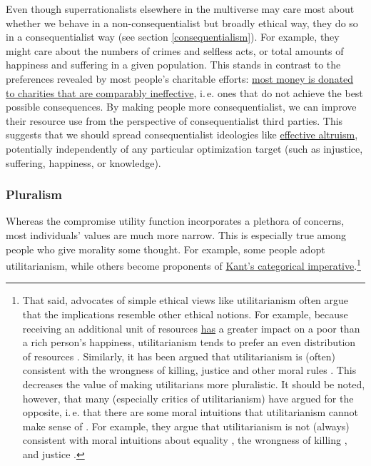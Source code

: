 Even though superrationalists elsewhere in the multiverse may care most
about whether we behave in a non-consequentialist but broadly ethical
way, they do so in a consequentialist way (see section
\ref{consequentialism}). For
example, they might care about the numbers of crimes and selfless acts,
or total amounts of happiness and suffering in a given population. This
stands in contrast to the preferences revealed by most people's
charitable efforts: \href{http://www.givewell.org/giving101}{most
money is donated to charities that are comparably ineffective}, i.\,e.
ones that do not achieve the best possible consequences. By making
people more consequentialist, we can improve their resource use from the
perspective of consequentialist third parties. This suggests that we
should spread consequentialist ideologies like
\href{https://en.wikipedia.org/wiki/Effective_altruism}{effective
altruism}, potentially independently of any particular optimization
target (such as injustice, suffering, happiness, or knowledge).

\hypertarget{pluralism}{\subsubsection{Pluralism}\label{pluralism}}

Whereas the compromise utility function incorporates a plethora of
concerns, most individuals' values are much more narrow. This is
especially true among people who give morality some thought. For
example, some people adopt utilitarianism, while others become
proponents of
\href{https://en.wikipedia.org/wiki/Categorical_imperative}{Kant's
categorical imperative}.\footnote{That said, advocates of simple
  ethical views like utilitarianism often argue that the implications
  resemble other ethical notions. For example, because receiving an
  additional unit of resources
  \href{https://80000hours.org/articles/money-and-happiness/}{has}
  a greater impact on a poor than a rich person's happiness,
  utilitarianism tends to prefer an even distribution of resources
  \parencite{studebaker_2012-yb}. Similarly, it has been
  argued that utilitarianism is (often) consistent with the wrongness of
  killing, justice \parencite{Mill1863-bm} and other moral
  rules \parencite[part 1, chapter 7]{Smart1973-eo}. This decreases the value
  of making utilitarians more pluralistic. It should be noted, however,
  that many (especially critics of utilitarianism) have argued for the
  opposite, i.\,e. that there are some moral intuitions that
  utilitarianism cannot make sense of
  \parencite[section 3.b.i]{nathanson_undated-mj}. For example, they argue
  that utilitarianism is not (always) consistent with moral intuitions
  about equality \parencite{Pogge1995-mo,Gosepath2011-vx},
  the wrongness of killing \parencite{Henson1971-le}, and
  justice \parencite[part 1, chapter 10]{Smart1973-eo}.}

